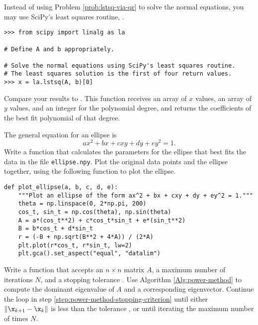 Instead of using Problem \ref{prob:lstsq-via-qr} to solve the normal equations, you may use SciPy's least squares routine, .

\begin{lstlisting}
>>> from scipy import linalg as la

# Define A and b appropriately.

# Solve the normal equations using SciPy's least squares routine.
# The least squares solution is the first of four return values.
>>> x = la.lstsq(A, b)[0]
\end{lstlisting}

Compare your results to .
This function receives an array of $x$ values, an array of $y$ values, and an integer for the polynomial degree, and returns the coefficients of the best fit polynomial of that degree.

\begin{comment}
\begin{lstlisting}
# Generate some random data close to the line y = x^2 - 3x + 2.
>>> x = np.linspace(0, 10, 20)
>>> y = x**2 - 3*x + 2 + np.random.randn(20)

# Use np.polyfit() to calculate the best fit 2nd degree polynomial.
>>> coeffs = np.polyfit(x, y, 2)

>>> domain = np.linspace(0, 10, 200)
>>> plt.plot(x, y, 'k*')
>>> plt.plot(domain, np.polyval(coeffs, domain))
>>> plt.show()
\end{lstlisting}
\end{comment}

\label{prob:polynomial-least-squares}

The general equation for an ellipse is \[ax^2 + bx + cxy + dy + ey^2 = 1.\]
Write a function that calculates the parameters for the ellipse that best fits the data in the file \texttt{ellipse.npy}.
Plot the original data points and the ellipse together, using the following function to plot the ellipse.

\begin{lstlisting}
def plot_ellipse(a, b, c, d, e):
    """Plot an ellipse of the form ax^2 + bx + cxy + dy + ey^2 = 1."""
    theta = np.linspace(0, 2*np.pi, 200)
    cos_t, sin_t = np.cos(theta), np.sin(theta)
    A = a*(cos_t**2) + c*cos_t*sin_t + e*(sin_t**2)
    B = b*cos_t + d*sin_t
    r = (-B + np.sqrt(B**2 + 4*A)) / (2*A)
    plt.plot(r*cos_t, r*sin_t, lw=2)
    plt.gca().set_aspect("equal", "datalim")
\end{lstlisting}
Write a function that accepts an $n \times n$ matrix $A$, a maximum number of iterations $N$, and a stopping tolerance .
Use Algorithm \ref{Alg:power-method} to compute the dominant eigenvalue of $A$ and a corresponding eigenvector.
Continue the loop in step \ref{step:power-method-stopping-criterion} until either $\|\x_{k+1} - \x_k\|$ is less than the tolerance , or until iterating the maximum number of times $N$.

